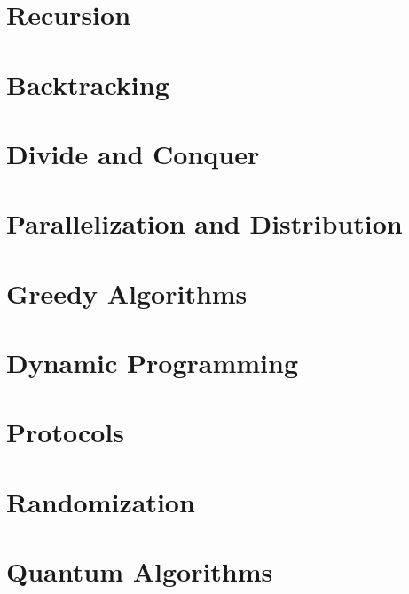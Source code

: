 \documentclass{book}
\begin{document}
\chapter{Recursion}\label{sec:ad:recurse}
 

\chapter{Backtracking}\label{sec:ad:backtrack}
 

\chapter{Divide and Conquer}\label{sec:ad:divcon}
 

\chapter{Parallelization and Distribution}\label{sec:ad:parallel}
 

\chapter{Greedy Algorithms}\label{sec:ad:greedy}
 

\chapter{Dynamic Programming}\label{sec:ad:dynprog}
 

\chapter{Protocols}\label{sec:ad:prot}
 

\chapter{Randomization}\label{sec:ad:random}
 
 
\chapter{Quantum Algorithms}\label{sec:ad:quantum}
 

\end{document}
